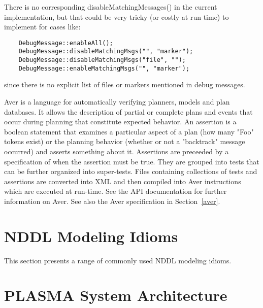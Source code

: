 \documentclass[10pt, letterpaper, twoside]{article}
\begin{document}
There is no corresponding disableMatchingMessages() in the current
implementation, but that could be very tricky (or costly at run time)
to implement for cases like:
\begin{verbatim}
	DebugMessage::enableAll();
	DebugMessage::disableMatchingMsgs("", "marker");
	DebugMessage::disableMatchingMsgs("file", "");
	DebugMessage::enableMatchingMsgs("", "marker");
\end{verbatim}
since there is no explicit list of files or markers mentioned in
debug messages.

Aver is a language for automatically verifying planners, models and plan
databases. It allows the description of partial or complete plans and
events that occur during planning that constitute expected behavior.  An
assertion is a boolean statement that examines a particular aspect of a
plan (how many "Foo" tokens exist) or the planning behavior (whether or not
a "backtrack" message occurred) and asserts something about it. Assertions
are preceeded by a specification of when the assertion must be true. They
are grouped into tests that can be further organized into
super-tests. Files containing collections of tests and assertions are
converted into XML and then compiled into Aver instructions which are
executed at run-time.  See the API documentation for further information on
Aver.  See also the Aver specification in Section~\ref{aver}.

\section{NDDL Modeling Idioms}
This section presents a range of commonly used NDDL modeling idioms.


\section{PLASMA System Architecture}
\end{document}
